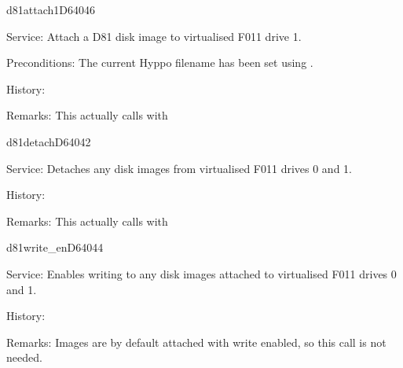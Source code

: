 \begin{hyppotrap}{d81attach1}{D640}{46}
\item [Service:]
  Attach a D81 disk image to virtualised F011 drive 1.
\item [Preconditions:]
  The current Hyppo filename has been set using .
\item [History:]
  \\
\item [Remarks:]
  This actually calls  with 
\end{hyppotrap}


\begin{hyppotrap}{d81detach}{D640}{42}
\item [Service:]
  Detaches any disk images from virtualised F011 drives 0 and 1.
\item [History:]
  \\
\item [Remarks:]
  This actually calls  with 
\end{hyppotrap}


%
\begin{hyppotrap}{d81write\_en}{D640}{44}
\item [Service:]
  Enables writing to any disk images attached to virtualised F011 drives 0
  and 1.
\item [History:]
\item [Remarks:]
  Images are by default attached with write enabled, so this call is not needed.
\end{hyppotrap}



\newpage

